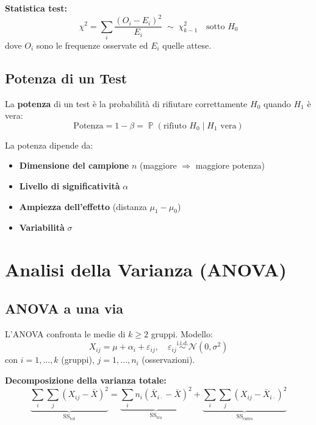 \documentclass[12pt, a4paper]{article}
\DeclareMathOperator{\Prob}{\mathbb{P}}
\newcommand{\N}{\mathcal{N}}
\newcommand{\iid}{\overset{\text{i.i.d.}}{\sim}}
\begin{document}
\textbf{Statistica test:}
\[
  \chi^2 = \sum_{i} \frac{(O_i - E_i)^2}{E_i} \;\sim\; \chi^2_{k-1}
  \quad \text{sotto } H_0
\]
dove $O_i$ sono le frequenze osservate ed $E_i$ quelle attese.

\subsection{Potenza di un Test}

\begin{definizione}[Potenza]
  La \textbf{potenza} di un test è la probabilità di rifiutare correttamente
  $H_0$ quando $H_1$ è vera:
  \[
    \text{Potenza} = 1 - \beta = \Prob(\text{rifiuto } H_0 \mid H_1 \text{ vera})
  \]
\end{definizione}

La potenza dipende da:
\begin{itemize}
  \item \textbf{Dimensione del campione} $n$ (maggiore $\Rightarrow$ maggiore potenza)
  \item \textbf{Livello di significatività} $\alpha$
  \item \textbf{Ampiezza dell'effetto} (distanza $\mu_1 - \mu_0$)
  \item \textbf{Variabilità} $\sigma$
\end{itemize}

\section{Analisi della Varianza (ANOVA)}

\subsection{ANOVA a una via}

L'ANOVA confronta le medie di $k \ge 2$ gruppi. Modello:
\[
  X_{ij} = \mu + \alpha_i + \varepsilon_{ij},
  \quad \varepsilon_{ij} \iid \N(0, \sigma^2)
\]
con $i = 1, \ldots, k$ (gruppi), $j = 1, \ldots, n_i$ (osservazioni).

\textbf{Decomposizione della varianza totale:}
\[
  \underbrace{\sum_{i}\sum_{j}(X_{ij} - \bar{X})^2}_{\text{SS}_\text{tot}}
  =
  \underbrace{\sum_{i} n_i(\bar{X}_{i\cdot} - \bar{X})^2}_{\text{SS}_\text{tra}}
  +
  \underbrace{\sum_{i}\sum_{j}(X_{ij} - \bar{X}_{i\cdot})^2}_{\text{SS}_\text{entro}}
\]
\end{document}
